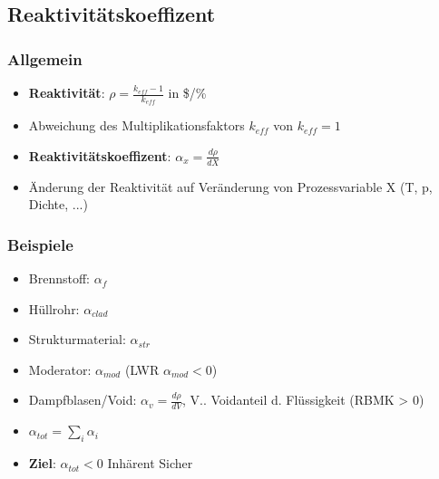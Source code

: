 \documentclass[12pt]{article}
\begin{document}
\subsection{Reaktivitätskoeffizent}
\subsubsection{Allgemein}
\begin{itemize}
  \item \textbf{Reaktivität}: \(\rho = \frac{k_{eff} - 1}{k_{eff}}\) in \$/\%
  \item Abweichung des Multiplikationsfaktors \(k_{eff}\) von \(k_{eff} = 1\)
  \item \textbf{Reaktivitätskoeffizent}: \(\alpha_x = \frac{d\rho}{dX}\)
  \item Änderung der Reaktivität auf Veränderung von Prozessvariable X (T, p, Dichte, ...)
\end{itemize}
\subsubsection{Beispiele}
\begin{itemize}
  \item Brennstoff: \(\alpha_f\)
  \item Hüllrohr: \(\alpha_{clad}\)
  \item Strukturmaterial: \(\alpha_{str}\)
  \item Moderator: \(\alpha_{mod}\) (LWR \(\alpha_{mod} < 0\))
  \item Dampfblasen/Void: \(\alpha_{v} = \frac{d\rho}{dV}\), V.. Voidanteil d. Flüssigkeit (RBMK > 0)
  \item \(\alpha_{tot} = \sum_{i}^{} \alpha_i\)
  \item \textbf{Ziel}: \(\alpha_{tot} < 0\) \textrightarrow Inhärent Sicher
\end{itemize}
\end{document}
